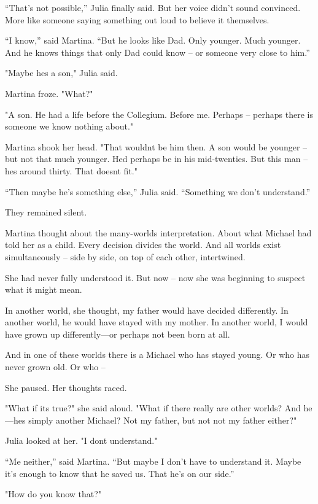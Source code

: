 \documentclass[
]{article}
\begin{document}
``That's not possible,'' Julia finally said. But her voice didn't sound convinced. More like someone saying something out loud to believe it themselves.

``I know,'' said Martina. ``But he looks like Dad. Only younger. Much younger. And he knows things that only Dad could know -- or someone very close to him.''

"Maybe he\textquotesingle s a son," Julia said.

Martina froze. "What?"

"A son. He had a life before the Collegium. Before me. Perhaps -- perhaps there is someone we know nothing about."

Martina shook her head. "That wouldn\textquotesingle t be him then. A son would be younger -- but not that much younger. He\textquotesingle d perhaps be in his mid-twenties. But this man -- he\textquotesingle s around thirty. That doesn\textquotesingle t fit."

``Then maybe he's something else,'' Julia said. ``Something we don't understand.''

They remained silent.

Martina thought about the many-worlds interpretation. About what Michael had told her as a child. Every decision divides the world. And all worlds exist simultaneously -- side by side, on top of each other, intertwined.

She had never fully understood it. But now -- now she was beginning to suspect what it might mean.

In another world, she thought, my father would have decided differently. In another world, he would have stayed with my mother. In another world, I would have grown up differently---or perhaps not been born at all.

And in one of these worlds there is a Michael who has stayed young. Or who has never grown old. Or who --

She paused. Her thoughts raced.

"What if it\textquotesingle s true?" she said aloud. "What if there really are other worlds? And he---he\textquotesingle s simply another Michael? Not my father, but not not my father either?"

Julia looked at her. "I don\textquotesingle t understand."

``Me neither,'' said Martina. ``But maybe I don't have to understand it. Maybe it's enough to know that he saved us. That he's on our side.''

"How do you know that?"
\end{document}
